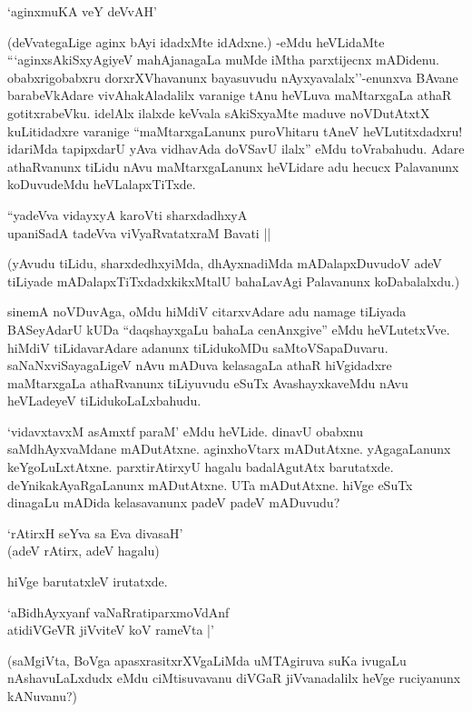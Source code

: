 \begin{shloka}
`aginxmuKA veY deVvAH'
\end{shloka}

(deVvategaLige aginx bAyi idadxMte idAdxne.) -eMdu heVLidaMte ```aginxsAkiSxyAgiyeV mahAjanagaLa muMde iMtha parxtijecnx mADidenu. obabxrigobabxru dorxrXVhavanunx bayasuvudu nAyxyavalalx''-enunxva BAvane barabeVkAdare vivAhakAladalilx varanige tAnu heVLuva maMtarxgaLa athaR gotitxrabeVku. idelAlx ilalxde keVvala sAkiSxyaMte maduve noVDutAtxtX kuLitidadxre varanige ``maMtarxgaLanunx puroVhitaru tAneV heVLutitxdadxru! idariMda tapipxdarU yAva vidhavAda doVSavU ilalx'' eMdu toVrabahudu. Adare athaRvanunx tiLidu nAvu maMtarxgaLanunx heVLidare adu hecucx Palavanunx koDuvudeMdu heVLalapxTiTxde.

\begin{shloka}
``yadeVva vidayxyA karoVti sharxdadhxyA\\
upaniSadA tadeVva viVyaRvatatxraM Bavati ||
\end{shloka}

(yAvudu tiLidu, sharxdedhxyiMda, dhAyxnadiMda mADalapxDuvudoV adeV tiLiyade mADalapxTiTxdadxkikxMtalU bahaLavAgi Palavanunx koDabalalxdu.)

sinemA noVDuvAga, oMdu hiMdiV citarxvAdare adu namage tiLiyada BASeyAdarU kUDa ``daqshayxgaLu bahaLa cenAnxgive'' eMdu heVLutetxVve. hiMdiV tiLidavarAdare adanunx tiLidukoMDu saMtoVSapaDuvaru. saNaNxviSayagaLigeV nAvu mADuva kelasagaLa athaR hiVgidadxre maMtarxgaLa athaRvanunx tiLiyuvudu eSuTx AvashayxkaveMdu nAvu heVLadeyeV tiLidukoLaLxbahudu.

`vidavxtavxM asAmxtf paraM' eMdu heVLide. dinavU obabxnu saMdhAyxvaMdane mADutAtxne. aginxhoVtarx mADutAtxne. yAgagaLanunx keYgoLuLxtAtxne. parxtirAtirxyU hagalu badalAgutAtx barutatxde. deYnikakAyaRgaLanunx mADutAtxne. UTa mADutAtxne. hiVge eSuTx dinagaLu mADida kelasavanunx padeV padeV mADuvudu?

\begin{shloka}
`rAtirxH seYva sa Eva divasaH'\\
(adeV rAtirx, adeV hagalu)
\end{shloka}

hiVge barutatxleV irutatxde.

\begin{shloka}
`aBidhAyxyanf vaNaRratiparxmoVdAnf\\
atidiVGeVR jiVviteV koV rameVta |'
\end{shloka}

(saMgiVta, BoVga apasxrasitxrXVgaLiMda uMTAgiruva suKa ivugaLu nAshavuLaLxdudx eMdu ciMtisuvavanu diVGaR jiVvanadalilx heVge ruciyanunx kANuvanu?)

